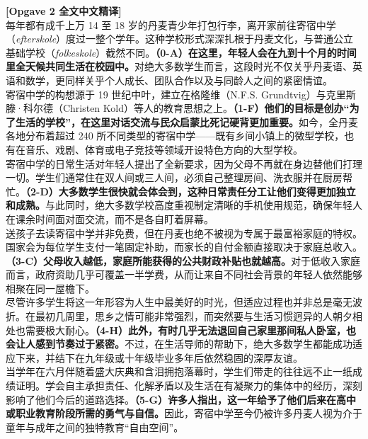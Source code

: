 \begin{transbox}
\small
\textbf{\color{NCDTeal}[Opgave 2 全文中文精译]}\\
每年都有成千上万 14 至 18 岁的丹麦青少年打包行李，离开家前往寄宿中学（\textit{efterskole}）度过一整个学年。这种学校形式深深扎根于丹麦文化，与普通公立基础学校（\textit{folkeskole}）截然不同。\textbf{（0-A）在这里，年轻人会在九到十个月的时间里全天候共同生活在校园中。}对绝大多数学生而言，这段时光不仅关乎丹麦语、英语和数学，更同样关乎个人成长、团队合作以及与同龄人之间的紧密情谊。\\[3pt]
寄宿中学的构想源于 19 世纪中叶，建立在格隆维（N.F.S. Grundtvig）与克里斯滕·科尔德（Christen Kold）等人的教育思想之上。\textbf{（1-F）他们的目标是创办“为了生活的学校”，在这里对话交流与民众启蒙比死记硬背更加重要。}如今，全丹麦各地分布着超过 240 所不同类型的寄宿中学——既有乡间小镇上的微型学校，也有在音乐、戏剧、体育或电子竞技等领域开设特色方向的大型学校。\\[3pt]
寄宿中学的日常生活对年轻人提出了全新要求，因为父母不再就在身边替他们打理一切。学生们通常住在双人间或三人间，必须自己整理房间、洗衣服并在厨房帮忙。\textbf{（2-D）大多数学生很快就会体会到，这种日常责任分工让他们变得更加独立和成熟。}与此同时，绝大多数学校高度重视制定清晰的手机使用规范，确保年轻人在课余时间面对面交流，而不是各自盯着屏幕。\\[3pt]
送孩子去读寄宿中学并非免费，但在丹麦也绝不被视为专属于最富裕家庭的特权。国家会为每位学生支付一笔固定补助，而家长的自付金额直接取决于家庭总收入。\textbf{（3-C）父母收入越低，家庭所能获得的公共财政补贴也就越高。}对于低收入家庭而言，政府资助几乎可覆盖一半学费，从而让来自不同社会背景的年轻人依然能够相聚在同一屋檐下。\\[3pt]
尽管许多学生将这一年形容为人生中最美好的时光，但适应过程也并非总是毫无波折。在最初几周里，思乡之情可能非常强烈，而突然要与生活习惯迥异的人朝夕相处也需要极大耐心。\textbf{（4-H）此外，有时几乎无法退回自己家里那间私人卧室，也会让人感到节奏过于紧密。}不过，在生活导师的帮助下，绝大多数学生都能成功适应下来，并结下在九年级或十年级毕业多年后依然稳固的深厚友谊。\\[3pt]
当学年在六月伴随着盛大庆典和含泪拥抱落幕时，学生们带走的往往远不止一纸成绩证明。学会自主承担责任、化解矛盾以及生活在有凝聚力的集体中的经历，深刻影响了他们今后的道路选择。\textbf{（5-G）许多人指出，这一年给予了他们后来在高中或职业教育阶段所需的勇气与自信。}因此，寄宿中学至今仍被许多丹麦人视为介于童年与成年之间的独特教育“自由空间”。
\end{transbox}

